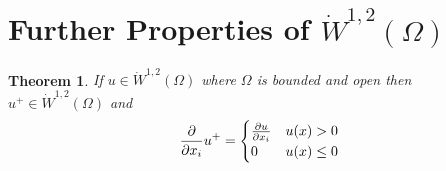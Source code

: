 \documentclass[10pt, oneside, reqno]{amsart}
\theoremstyle{plain}%
\newtheorem{thm}{Theorem}[section]
\numberwithin{equation}{section}
\theoremstyle{definition}
\theoremstyle{remark}
\begin{document}

\section{Further Properties of $\dot W^{1,2}(\Omega)$} %
\label{sec:further_properties_of_dot_w_1_2_omega_}
\begin{thm}
    \label{thm:his_thm_7.1}
    If $u \in \dot W^{1, 2}(\Omega)$ where $\Omega$ is bounded and open then $u^+ \in \dot W^{1, 2}(\Omega)$ and \[
        \frac{\partial }{\partial x_i} u^+ = \begin{cases}
            \frac{\partial u}{\partial x_i} & u(x) > 0 \\
            0 & u(x) \leq 0
        \end{cases}
    \]  
\end{thm}
\end{document}
